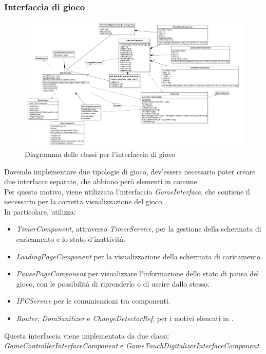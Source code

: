 \subsubsection{Interfaccia di gioco}
\begin{figure}[h]
    \centering
    \includegraphics[width=340pt]{images/prog/GameInterface.png}
    \caption{Diagramma delle classi per l'interfaccia di gioco}
    \label{fig:gameinterface}
\end{figure}
Dovendo implementare due tipologie di gioco, dev'essere necessario poter creare due interfacce separate, che abbiano però elementi in comune.\\
Per questo motivo, viene utilizzata l'interfaccia \emph{GameInterface}, che contiene il necessario per la corretta visualizzazione del gioco.\\
In particolare, utilizza:
\begin{itemize}
    \item \emph{TimerComponent}, attraverso \emph{TimerService}, per la gestione della schermata di caricamento e lo stato d'inattività.
    \item \emph{LoadingPageComponent} per la visualizzazione della schermata di caricamento.
    \item \emph{PausePageComponent} per visualizzare l'informazione dello stato di pausa del gioco, con le possibilità di riprenderlo o di uscire dallo stesso.
    \item \emph{IPCService} per le comunicazioni tra componenti.
    \item \emph{Router}, \emph{DomSanitizer} e \emph{ChangeDetectorRef}, per i motivi elencati in .
\end{itemize}
Questa interfaccia viene implementata da due classi: \emph{GameControllerInterfaceComponent} e \emph{GameTouchDigitalizerInterfaceComponent}.
\newpage
